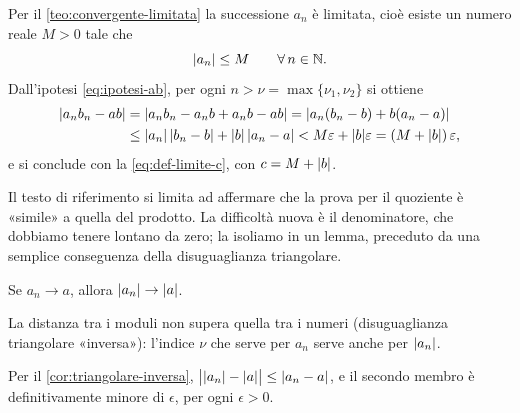 \begin{dimostrazione}
Per il \cref{teo:convergente-limitata} la successione $a_{n}$ è limitata, cioè esiste un
numero reale $M>0$ tale che
\begin{equation}\label{eq:an-limitata}
  \lvert a_{n}\rvert\le M \qquad\forall\, n\in\mathbb{N} .
\end{equation}
Dall'ipotesi \eqref{eq:ipotesi-ab}, per ogni $n>\nu=\max\{\nu_{1},\nu_{2}\}$ si ottiene
\begin{equation}\label{eq:prodotto-passo-2}
\begin{split}
  \lvert a_{n}b_{n}-ab\rvert&=\lvert a_{n}b_{n}-a_{n}b+a_{n}b-ab\rvert=\lvert a_{n}(b_{n}-b)+b(a_{n}-a)\rvert\\
  &\le\lvert a_{n}\rvert\,\lvert b_{n}-b\rvert+\lvert b\rvert\,\lvert a_{n}-a\rvert<M\varepsilon+\lvert b\rvert\varepsilon=(M+\lvert b\rvert)\,\varepsilon,
\end{split}
\end{equation}
e si conclude con la \eqref{eq:def-limite-c}, con $c=M+\lvert b\rvert$.
\end{dimostrazione}

Il testo di riferimento \cite{marcellini-sbordone} si limita ad affermare che la prova per
il quoziente è «simile» a quella del prodotto. La difficoltà nuova è il denominatore, che
dobbiamo tenere lontano da zero; la isoliamo in un lemma, preceduto da una semplice
conseguenza della disuguaglianza triangolare.

\begin{lemma}\label{lem:lim-modulo}
Se $a_{n}\to a$, allora $\lvert a_{n}\rvert\to\lvert a\rvert$.
\end{lemma}

\begin{schema}
\end{schema}

\begin{strategia}
La distanza tra i moduli non supera quella tra i numeri (disuguaglianza triangolare
«inversa»): l'indice $\nu$ che serve per $a_{n}$ serve anche per $\lvert a_{n}\rvert$.
\end{strategia}

\begin{dimostrazione}
Per il \cref{cor:triangolare-inversa},
$\bigl|\lvert a_{n}\rvert-\lvert a\rvert\bigr|\le\lvert a_{n}-a\rvert$, e il secondo membro è definitivamente
minore di $\epsilon$, per ogni $\epsilon>0$.
\end{dimostrazione}

